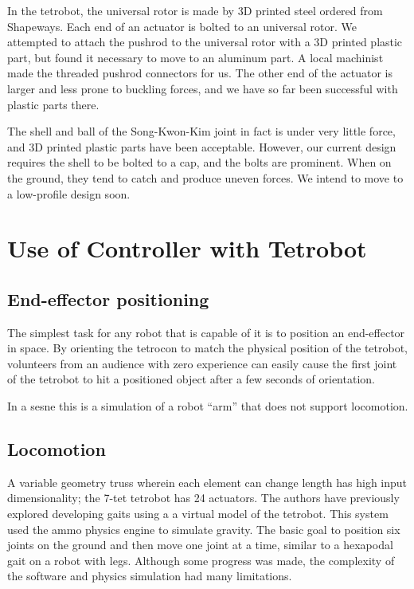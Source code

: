 \documentclass[conference]{IEEEtran}
\begin{document}
In the tetrobot, the universal rotor is made by 3D printed steel ordered from Shapeways. Each
end of an actuator is bolted to an universal rotor. We attempted to attach the pushrod to the
universal rotor with a 3D printed plastic part, but found it necessary to move to an aluminum part.
A local machinist made the threaded pushrod connectors for us. The other end of the actuator is
larger and less prone to buckling forces, and we have so far been successful with plastic parts there.

The shell and ball of the Song-Kwon-Kim joint in fact is under very little force, and 3D printed
plastic parts have been acceptable. However, our current design requires the shell to be bolted
to a cap, and the bolts are prominent. When on the ground, they tend to catch and produce uneven
forces. We intend to move to a low-profile design soon.


 \section{Use of Controller with Tetrobot}

 \subsection{End-effector positioning}

 The simplest task for any robot that is capable of it is to position
 an end-effector in space. By orienting the tetrocon to match
 the physical position of the tetrobot, volunteers from an audience
 with zero experience can easily cause the first joint of the tetrobot
 to hit a positioned object after a few seconds of orientation.

 In a sesne this is a simulation of a robot ``arm'' that does not
 support locomotion.

 \subsection{Locomotion}

 A variable geometry truss wherein each element can change length
 has high input dimensionality; the 7-tet tetrobot has 24 actuators.
 The authors have previously explored developing gaits using a
 a virtual model of the tetrobot. This system used the ammo
 physics engine to simulate gravity. The basic goal to position
 six joints on the ground and then move one joint at a time,
 similar to a hexapodal gait on a robot with legs. Although
 some progress was made, the complexity of the software and
 physics simulation had many limitations.
\end{document}
